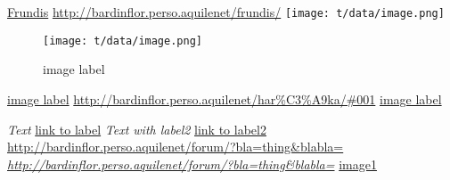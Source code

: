 \href{http://bardinflor.perso.aquilenet/frundis/}{Frundis}
\url{http://bardinflor.perso.aquilenet/frundis/}
\texttt{[image: t/data/image.png]}\hypertarget{label1}{}

\begin{center}
\begin{figure}[htbp]
\texttt{[image: t/data/image.png]}
\caption{image label}
\label{fig:1}
\end{figure}
\end{center}
\hyperref[fig:1]{image label}
\url{http://bardinflor.perso.aquilenet/har\%C3\%A9ka/#001}
\hyperref[fig:1]{image label}

\hypertarget{label1}{}\emph{Text}
\hyperlink{label1}{link to label}
\hypertarget{label2}{}\emph{Text with label2}
\hyperlink{label2}{link to label2}
\url{http://bardinflor.perso.aquilenet/forum/?bla=thing&blabla=}
\emph{\url{http://bardinflor.perso.aquilenet/forum/?bla=thing&blabla=}}
\hyperlink{label1}{image1}

